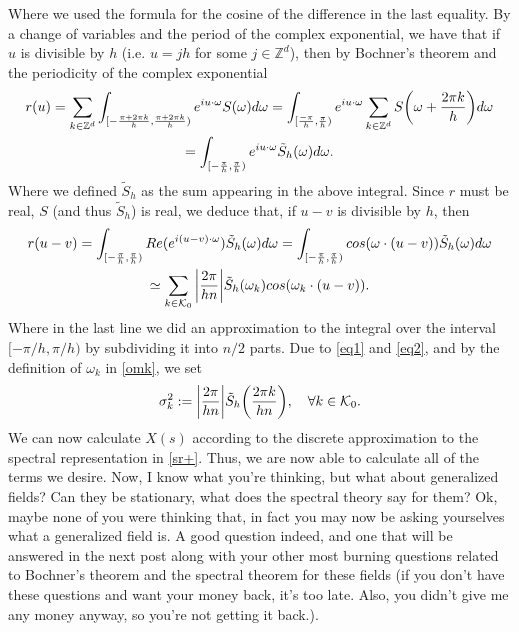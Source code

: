 \documentclass[12pt]{article}
\begin{document}
Where we used the formula for the cosine of the difference in the last equality.
By a change of variables and the period of the complex exponential, we have that if $u$ is divisible by  $h$ (i.e. $u=jh$ for some $j\in\mathbb{Z}^d$), then by Bochner's theorem and the periodicity of the complex exponential
\begin{multline*}
    r(u)=\sum_{k\in {\mathbb Z}^d} \int_{[-\frac{\pi+2\pi k}{h},\frac{\pi+2\pi k}{h})} e^{iu\cdot\omega}S(\omega)d\omega= \int_{[\frac{-\pi}{h},\frac{\pi}{h})} e^{iu\cdot\omega}\sum_{k\in {\mathbb Z}^d} S\qty(\omega+ \frac{ 2\pi k}{h})d\omega\\=\int_{[-\frac{\pi}{h},\frac{\pi}{h})} e^{iu\cdot\omega}\tilde{S}_h(\omega)d\omega.
\end{multline*}
Where we defined $\tilde{S}_h$ as the sum appearing in the above integral.
Since $r$ must be real, $S$ (and thus $\tilde{S}_h$) is real, we deduce that, if $u-v$ is divisible by  $h$, then
\begin{multline}\label{eq2}
    r(u-v)=\int_{[-\frac{\pi}{h},\frac{\pi}{h})} Re(e^{i(u-v)\cdot\omega})\tilde{S}_h(\omega)d\omega=\int_{[-\frac{\pi}{h},\frac{\pi}{h})}cos(\omega\cdot(u-v)) \tilde{S}_h(\omega)d\omega\\
    \simeq \sum_{k \in \mathcal{K}_0}\abs{\frac{2\pi}{hn}}\tilde{S}_h(\omega_k)cos(\omega_k\cdot(u-v)).
\end{multline}
Where in the last line we did an approximation to the integral over the interval $[-\pi/h,\pi/h)$ by subdividing it into $n/2$ parts.
Due to \eqref{eq1} and \eqref{eq2}, and by the definition of $\omega_k$ in \eqref{omk},  we set
\begin{equation*}
    \sigma _k^2:= \abs{\frac{2\pi}{hn}}\tilde{S}_h\qty(\frac{2\pi k}{hn}),\quad\forall k\in \mathcal{K}_0.
\end{equation*}
We can now calculate $X(s)$ according to the discrete approximation to the spectral representation in \eqref{sr+}. Thus, we are now able to calculate all of the terms we desire.
Now, I know what you're thinking, but what about generalized fields? Can they be stationary, what does the spectral theory say for them? Ok, maybe none of you were thinking that, in fact you may now be asking yourselves what a generalized field is. A good question indeed, and one that will be answered in the next post along with your other most burning questions related to Bochner's theorem and the spectral theorem for these fields (if you don't have these questions and want your money back, it's too late. Also, you didn't give me any money anyway, so you're not getting it back.).
\end{document}

